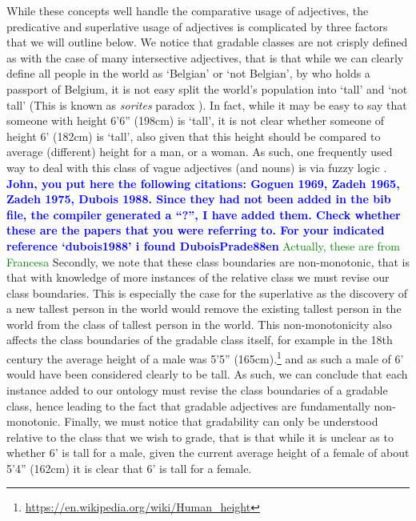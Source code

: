 \documentclass[11pt]{article}
\begin{document}
While these concepts well handle the comparative usage of adjectives, the 
predicative and superlative usage of adjectives is complicated by three factors
that we will outline below. We notice that gradable classes are not 
crisply defined as with the case of many intersective adjectives, that is that 
while we can clearly define all people in the world as `Belgian' or 
`not Belgian', by who holds a passport of Belgium, it is not easy 
split the world's population into `tall' and `not tall' (This is known as \emph{sorites} paradox \cite{Bennett06kr}).
In fact, while it may 
be easy to say that someone with height 6'6'' (198cm) is `tall', it is not clear 
whether someone of height 6' (182cm) is `tall', also given that this height should be compared to average (different)
height for a man, or a woman. 
As such, one frequently used way to deal with this class of vague adjectives (and nouns) is via fuzzy logic \cite{Goguen1969fuzzy,Zadeh1975fuzzy,Zadeh1965fuzzy,DuboisPrade88en,Bennett06kr}.
\textbf{\textcolor{blue}{John, you put here the following citations: Goguen 1969, Zadeh 1965, Zadeh 1975, Dubois 1988. Since they had not been added in the bib file, the compiler generated a ``?'', I have added them. Check whether these are the papers that you were referring to. For your indicated reference `dubois1988' i found DuboisPrade88en}}
\textcolor{green}{Actually, these are from Francesa}
Secondly, we note that these class boundaries are 
non-monotonic, that is that with knowledge of more instances of the relative 
class we must revise our class boundaries. This is especially the case for the
superlative as the discovery of a new tallest person in the world would remove 
the existing tallest person in the world from the class of tallest person in the 
world. This non-monotonicity also affects the class boundaries of the gradable 
class itself, for example in the 18th century the average height of a male was 
5'5'' (165cm).\footnote{\url{https://en.wikipedia.org/wiki/Human_height}}
and as such a male of 6' would have been considered clearly to be 
tall. As such, we can conclude that each instance added to our ontology must 
revise the class boundaries of a gradable class, hence leading to the fact that 
gradable adjectives are fundamentally non-monotonic. Finally, we must notice 
that gradability can only be understood relative to the class that we wish to 
grade, that is that while it is unclear as to whether 6' is tall for a male, 
given the current average height of a female of about 5'4'' (162cm) it is clear 
that 6' is tall for a female.
\end{document}
